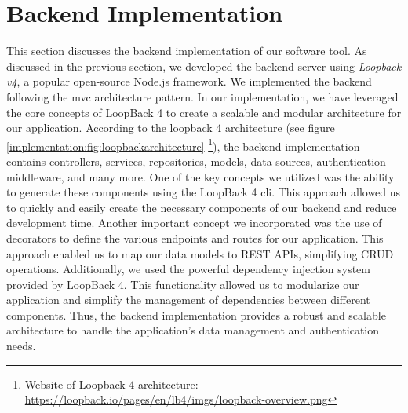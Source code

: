 \section{Backend Implementation}
\label{implementation:section:backend}
This section discusses the backend implementation of our software tool. 
As discussed in the previous section, we developed the backend server using \textit{Loopback v4}, a popular open-source Node.js framework.
We implemented the backend following the \ac{mvc} architecture pattern. 
In our implementation, we have leveraged the core concepts of LoopBack 4 to create a scalable and modular architecture for our application.
According to the loopback 4 architecture (see figure \ref{implementation:fig:loopbackarchitecture} \footnote{Website of Loopback 4 architecture: \url{https://loopback.io/pages/en/lb4/imgs/loopback-overview.png}}), the backend implementation contains controllers, services, repositories, models, data sources, authentication middleware, and many more.
One of the key concepts we utilized was the ability to generate these components using the LoopBack 4 \ac{cli}.
This approach allowed us to quickly and easily create the necessary components of our backend and reduce development time.
Another important concept we incorporated was the use of decorators to define the various endpoints and routes for our application. 
This approach enabled us to map our data models to REST APIs, simplifying CRUD operations.
Additionally, we used the powerful dependency injection system provided by LoopBack 4. 
This functionality allowed us to modularize our application and simplify the management of dependencies between different components.
Thus, the backend implementation provides a robust and scalable architecture to handle the application's data management and authentication needs.
